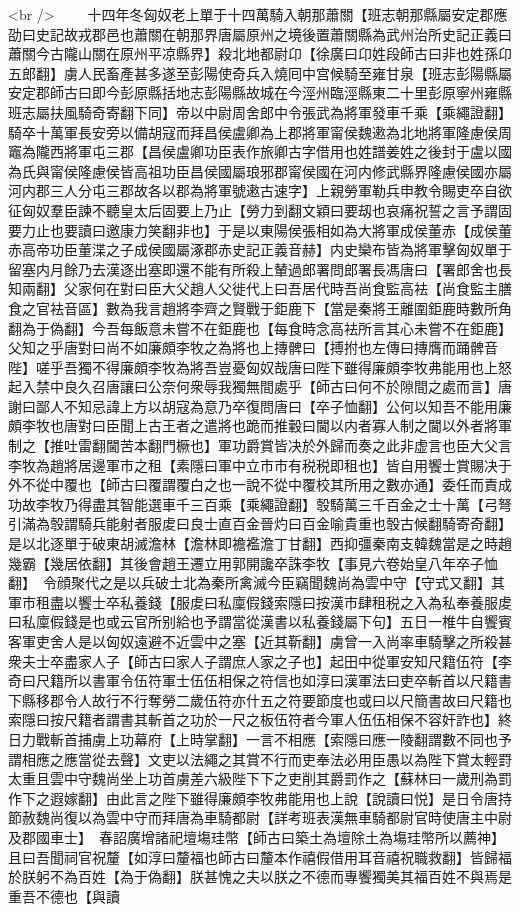 <br />
　　十四年冬匈奴老上單于十四萬騎入朝那蕭關【班志朝那縣屬安定郡應劭曰史記故戎郡邑也蕭關在朝那界唐屬原州之境後置蕭關縣為武州治所史記正義曰蕭關今古隴山關在原州平凉縣界】殺北地都尉卬【徐廣曰卬姓段師古曰非也姓孫卬五郎翻】虜人民畜產甚多遂至彭陽使奇兵入燒囘中宫候騎至雍甘泉【班志彭陽縣屬安定郡師古曰即今彭原縣括地志彭陽縣故城在今涇州臨涇縣東二十里彭原寧州雍縣班志屬扶風騎奇寄翻下同】帝以中尉周舍郎中令張武為將軍發車千乘【乘繩證翻】騎卒十萬軍長安旁以備胡寇而拜昌侯盧卿為上郡將軍甯侯魏遫為北地將軍隆慮侯周竈為隴西將軍屯三郡【昌侯盧卿功臣表作旅卿古字借用也姓譜姜姓之後封于盧以國為氏與甯侯隆慮侯皆高祖功臣昌侯國屬琅邪郡甯侯國在河内修武縣界隆慮侯國亦屬河内郡三人分屯三郡故各以郡為將軍號遫古速字】上親勞軍勒兵申教令賜吏卒自欲征匈奴羣臣諫不聽皇太后固要上乃止【勞力到翻文穎曰要刼也哀痛祝誓之言予謂固要力止也要讀曰邀康力笑翻非也】于是以東陽侯張相如為大將軍成侯董赤【成侯董赤高帝功臣董渫之子成侯國屬涿郡赤史記正義音赫】内史欒布皆為將軍擊匈奴單于留塞内月餘乃去漢逐出塞即還不能有所殺上輦過郎署問郎署長馮唐曰【署郎舍也長知兩翻】父家何在對曰臣大父趙人父徙代上曰吾居代時吾尚食監高袪【尚食監主膳食之官袪音區】數為我言趙將李齊之賢戰于鉅鹿下【當是秦將王離圍鉅鹿時數所角翻為于偽翻】今吾每飯意未嘗不在鉅鹿也【每食時念高袪所言其心未嘗不在鉅鹿】父知之乎唐對曰尚不如廉頗李牧之為將也上摶髀曰【搏拊也左傳曰摶膺而踊髀音陛】嗟乎吾獨不得廉頗李牧為將吾豈憂匈奴哉唐曰陛下雖得廉頗李牧弗能用也上怒起入禁中良久召唐讓曰公奈何衆辱我獨無間處乎【師古曰何不於隙間之處而言】唐謝曰鄙人不知忌諱上方以胡寇為意乃卒復問唐曰【卒子恤翻】公何以知吾不能用廉頗李牧也唐對曰臣聞上古王者之遣將也跪而推轂曰閫以内者寡人制之閫以外者將軍制之【推吐雷翻閫苦本翻門橛也】軍功爵賞皆决於外歸而奏之此非虚言也臣大父言李牧為趙將居邊軍市之租【素隱曰軍中立市市有税税即租也】皆自用饗士賞賜决于外不從中覆也【師古曰覆謂覆白之也一說不從中覆校其所用之數亦通】委任而責成功故李牧乃得盡其智能選車千三百乘【乘繩證翻】彀騎萬三千百金之士十萬【弓弩引滿為彀謂騎兵能射者服䖍曰良士直百金晉灼曰百金喻貴重也彀古候翻騎寄奇翻】是以北逐單于破東胡滅澹林【澹林即襜襤澹丁甘翻】西抑彊秦南支韓魏當是之時趙幾霸【幾居依翻】其後會趙王遷立用郭開讒卒誅李牧【事見六卷始皇八年卒子恤翻】　令顔聚代之是以兵破士北為秦所禽滅今臣竊聞魏尚為雲中守【守式又翻】其軍市租盡以饗士卒私養錢【服䖍曰私廩假錢索隱曰按漢市肆租税之入為私奉養服䖍曰私廩假錢是也或云官所别給也予謂當從漢書以私養錢屬下句】五日一椎牛自饗賓客軍吏舍人是以匈奴遠避不近雲中之塞【近其靳翻】虜曾一入尚率車騎擊之所殺甚衆夫士卒盡家人子【師古曰家人子謂庶人家之子也】起田中從軍安知尺籍伍符【李奇曰尺籍所以書軍令伍符軍士伍伍相保之符信也如淳曰漢軍法曰吏卒斬首以尺籍書下縣移郡令人故行不行奪勞二歲伍符亦什五之符要節度也或曰以尺簡書故曰尺籍也索隱曰按尺籍者謂書其斬首之功於一尺之板伍符者今軍人伍伍相保不容奸詐也】終日力戰斬首捕虜上功幕府【上時掌翻】一言不相應【索隱曰應一陵翻謂數不同也予謂相應之應當從去聲】文吏以法繩之其賞不行而吏奉法必用臣愚以為陛下賞太輕罸太重且雲中守魏尚坐上功首虜差六級陛下下之吏削其爵罰作之【蘇林曰一歲刑為罰作下之遐嫁翻】由此言之陛下雖得廉頗李牧弗能用也上說【說讀曰悦】是日令唐持節赦魏尚復以為雲中守而拜唐為車騎都尉【詳考班表漢無車騎都尉官時使唐主中尉及郡國車士】　春詔廣增諸祀壇塲珪幣【師古曰築土為壇除土為塲珪幣所以薦神】且曰吾聞祠官祝釐【如淳曰釐福也師古曰釐本作禧假借用耳音禧祝職救翻】皆歸福於朕躬不為百姓【為于偽翻】朕甚愧之夫以朕之不德而專饗獨美其福百姓不與焉是重吾不德也【與讀